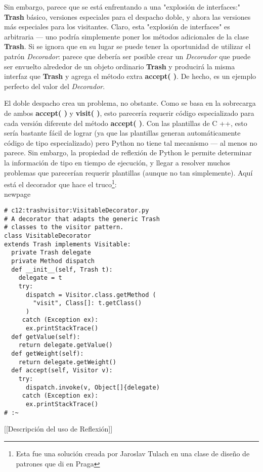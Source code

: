 Sin embargo, parece que se está enfrentando a una "explosión de interfaces:" \textbf{Trash} básico, versiones especiales para el despacho doble, y ahora las versiones más especiales para los visitantes. Claro, esta "explosión de interfaces" es arbitraria — uno podría simplemente poner los métodos adicionales de la clase \textbf{Trash}. Si se ignora que en su lugar se puede tener la oportunidad de utilizar el patrón \textit{Decorador}: parece que debería ser posible crear un \textit{Decorador} que puede ser envuelto alrededor de un objeto ordinario \textbf{Trash} y producirá la misma interfaz que \textbf{Trash} y agrega el método extra \textbf{accept( )}. De hecho, es un ejemplo perfecto del valor del \textit{Decorador}.         \newline

El doble despacho crea un problema, no obstante. Como se basa en la sobrecarga de ambos \textbf{accept( )} y \textbf{visit( )}, esto parecería requerir código especializado para cada versión diferente del método \textbf{accept( )}. Con las plantillas de C ++, esto sería bastante fácil de lograr (ya que las plantillas generan automáticamente código de tipo especializado) pero Python no tiene tal mecanismo — al menos no parece. Sin embargo, la propiedad de reflexión de Python le permite determinar la información de tipo en tiempo de ejecución, y llegar a resolver muchos problemas que parecerían requerir plantillas (aunque no tan simplemente). Aquí está el decorador que hace el truco\footnote{Esta fue una solución creada por Jaroslav Tulach en una clase de diseño de patrones que di en Praga}:       \\newpage

\begin{lstlisting} 
# c12:trashvisitor:VisitableDecorator.py 
# A decorator that adapts the generic Trash 
# classes to the visitor pattern. 
class VisitableDecorator 
extends Trash implements Visitable: 
  private Trash delegate 
  private Method dispatch 
  def __init__(self, Trash t): 
    delegate = t 
    try: 
      dispatch = Visitor.class.getMethod ( 
        "visit", Class[]: t.getClass()  
      ) 
     catch (Exception ex): 
      ex.printStackTrace() 
  def getValue(self): 
    return delegate.getValue() 
  def getWeight(self): 
    return delegate.getWeight() 
  def accept(self, Visitor v): 
    try: 
      dispatch.invoke(v, Object[]{delegate) 
     catch (Exception ex): 
      ex.printStackTrace() 
# :~ 
\end{lstlisting}

[[Descripción del uso de Reflexión]]  \newline

